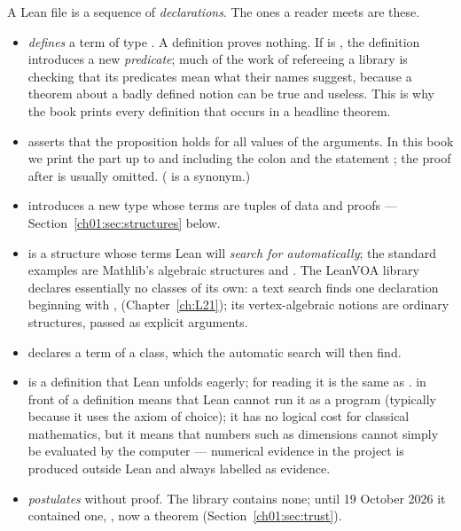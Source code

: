 A Lean file is a sequence of \emph{declarations}. The ones a reader meets are these.
\begin{itemize}
\item {} \emph{defines} a term of type . A definition
  proves nothing. If  is , the definition introduces a new \emph{predicate}; much
  of the work of refereeing a library is checking that its predicates mean what their names
  suggest, because a theorem about a badly defined notion can be true and useless. This is why the
  book prints every definition that occurs in a headline theorem.
\item {} asserts that the proposition  holds for
  all values of the arguments. In this book we print the part up to and including the colon and the
  statement ; the proof after \lean{:=} is usually omitted. ( is a synonym.)
\item {} introduces a new type whose terms are tuples of data and proofs ---
  Section~\ref{ch01:sec:structures} below.
\item {} is a structure whose terms Lean will \emph{search for automatically}; the
  standard examples are Mathlib's algebraic structures  and
  . The LeanVOA library declares essentially no classes of its own: a text search finds one
  declaration beginning with , 
  (Chapter~\ref{ch:L21}); its vertex-algebraic notions are ordinary structures, passed as explicit
  arguments.
\item {} declares a term of a class, which the automatic search will then find.
\item {} is a definition that Lean unfolds eagerly; for reading it is the same as
  .  in front of a definition means that Lean cannot run it as a
  program (typically because it uses the axiom of choice); it has no logical cost for classical
  mathematics, but it means that numbers such as dimensions cannot simply be evaluated by the
  computer --- numerical evidence in the project is produced outside Lean and always labelled as
  evidence.
\item {} \emph{postulates}  without proof. The library contains none;
  until 19 October 2026 it contained one, , now a theorem
  (Section~\ref{ch01:sec:trust}).
\end{itemize}

